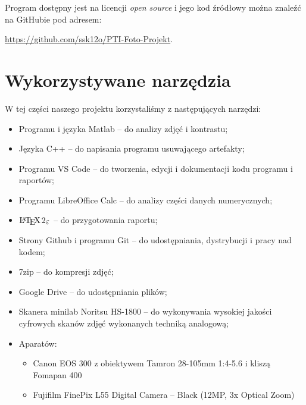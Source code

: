 \documentclass[]{mwart}
\begin{document}
Program dostępny jest na licencji \textit{open source} i jego kod źródłowy można znaleźć na GitHubie
pod adresem:
\begin{center}
    \url{https://github.com/ssk12o/PTI-Foto-Projekt}.
\end{center}




\newpage
\section{Wykorzystywane narzędzia}
W tej części naszego projektu korzystaliśmy z następujących narzędzi:
\begin{itemize}
    \item Programu i języka Matlab -- do analizy zdjęć i kontrastu;
    \item Języka C++ -- do napisania programu usuwającego artefakty;
    \item Programu VS Code -- do tworzenia, edycji i dokumentacji kodu programu i raportów;
    \item Programu LibreOffice Calc -- do analizy części danych numerycznych;
    \item $\LaTeXe{}$ -- do przygotowania raportu;
    \item Strony Github i programu Git -- do udostępniania, dystrybucji i pracy nad kodem;
    \item 7zip -- do kompresji zdjęć;
    \item Google Drive -- do udostępniania plików;
    \item Skanera minilab Noritsu HS-1800 -- do wykonywania wysokiej jakości cyfrowych skanów zdjęć wykonanych techniką analogową;
    \item Aparatów:
          \begin{itemize}
              \item Canon EOS 300 z obiektywem Tamron 28-105mm 1:4-5.6 i kliszą Fomapan 400
              \item Fujifilm FinePix L55 Digital Camera -- Black (12MP, 3x Optical Zoom)
          \end{itemize}
\end{itemize}
\end{document}
